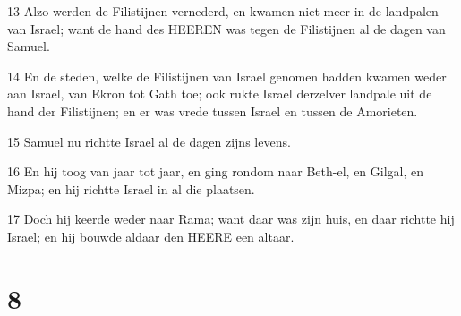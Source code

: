 \par 13 Alzo werden de Filistijnen vernederd, en kwamen niet meer in de landpalen van Israel; want de hand des HEEREN was tegen de Filistijnen al de dagen van Samuel.
\par 14 En de steden, welke de Filistijnen van Israel genomen hadden kwamen weder aan Israel, van Ekron tot Gath toe; ook rukte Israel derzelver landpale uit de hand der Filistijnen; en er was vrede tussen Israel en tussen de Amorieten.
\par 15 Samuel nu richtte Israel al de dagen zijns levens.
\par 16 En hij toog van jaar tot jaar, en ging rondom naar Beth-el, en Gilgal, en Mizpa; en hij richtte Israel in al die plaatsen.
\par 17 Doch hij keerde weder naar Rama; want daar was zijn huis, en daar richtte hij Israel; en hij bouwde aldaar den HEERE een altaar.

\chapter{8}

